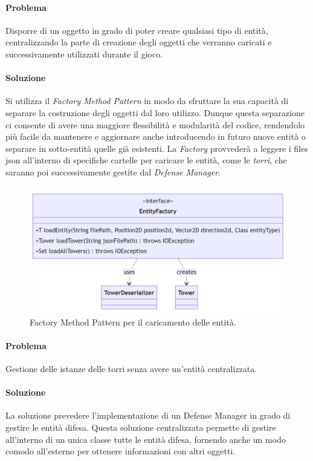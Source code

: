 \documentclass[a4paper,12pt]{report}
\begin{document}
\vspace{15mm}

\paragraph{Problema}
Disporre di un oggetto in grado di poter creare qualsiasi tipo di entità, centralizzando la parte di creazione degli oggetti che verranno caricati e successivamente utilizzati durante il gioco.

\paragraph{Soluzione}
Si utilizza il \textit{Factory Method Pattern} in modo da sfruttare la sua capacità di separare la costruzione degli oggetti dal loro utilizzo. Dunque questa separazione ci consente di avere una maggiore flessibilità e modularità del codice, rendendolo più facile da mantenere e aggiornare anche introducendo in futuro nuove entità o separare in sotto-entità quelle già esistenti. 
La \textit{Factory} provvederà a leggere i files json all'interno di specifiche cartelle per caricare
le entità, come le \textit{torri}, che saranno poi successivamente gestite dal \textit{Defense Manager}.


\begin{figure}[H]
    \centering
    \includegraphics[width=\textwidth]{entity_factory}
    \caption{Factory Method Pattern per il caricamento delle entità.}
    \label{fig:entity_factory}
\end{figure}
\vspace{70mm}

\paragraph{Problema}
Gestione delle istanze delle torri senza avere un'entità centralizzata.
\paragraph{Soluzione}
La soluzione prevedere l'implementazione di un Defense Manager in grado di gestire le entità difesa. Questa soluzione centralizzata permette di gestire all'interno di un unica classe tutte le entità difesa, fornendo anche un modo comodo all'esterno per ottenere informazioni con altri oggetti.
\end{document}

